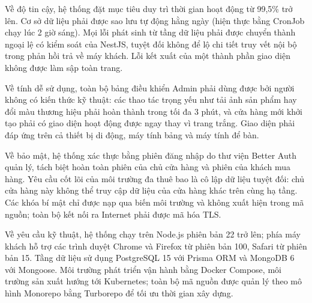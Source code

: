 \documentclass[../main.tex]{subfiles}
\begin{document}
Về độ tin cậy, hệ thống đặt mục tiêu duy trì thời gian hoạt động từ 99,5\% trở lên. Cơ sở dữ liệu phải được sao lưu tự động hằng ngày (hiện thực bằng CronJob chạy lúc 2 giờ sáng). Mọi lỗi phát sinh từ tầng dữ liệu phải được chuyển thành ngoại lệ có kiểm soát của NestJS, tuyệt đối không để lộ chi tiết truy vết nội bộ trong phản hồi trả về máy khách. Lỗi kết xuất của một thành phần giao diện không được làm sập toàn trang.

Về tính dễ sử dụng, toàn bộ bảng điều khiển Admin phải dùng được bởi người không có kiến thức kỹ thuật: các thao tác trọng yếu như tải ảnh sản phẩm hay đổi màu thương hiệu phải hoàn thành trong tối đa 3 phút, và cửa hàng mới khởi tạo phải có giao diện hoạt động được ngay thay vì trang trắng. Giao diện phải đáp ứng trên cả thiết bị di động, máy tính bảng và máy tính để bàn.

Về bảo mật, hệ thống xác thực bằng phiên đăng nhập do thư viện Better Auth quản lý, tách biệt hoàn toàn phiên của chủ cửa hàng và phiên của khách mua hàng. Yêu cầu cốt lõi của môi trường đa thuê bao là cô lập dữ liệu tuyệt đối: chủ cửa hàng này không thể truy cập dữ liệu của cửa hàng khác trên cùng hạ tầng. Các khóa bí mật chỉ được nạp qua biến môi trường và không xuất hiện trong mã nguồn; toàn bộ kết nối ra Internet phải được mã hóa TLS.

Về yêu cầu kỹ thuật, hệ thống chạy trên Node.js phiên bản 22 trở lên; phía máy khách hỗ trợ các trình duyệt Chrome và Firefox từ phiên bản 100, Safari từ phiên bản 15. Tầng dữ liệu sử dụng PostgreSQL 15 với Prisma ORM và MongoDB 6 với Mongoose. Môi trường phát triển vận hành bằng Docker Compose, môi trường sản xuất hướng tới Kubernetes; toàn bộ mã nguồn được quản lý theo mô hình Monorepo bằng Turborepo để tối ưu thời gian xây dựng.
\end{document}
